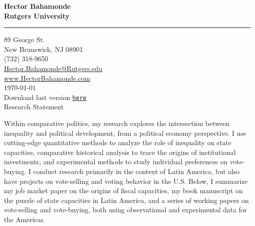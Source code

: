 \documentclass[11pt]{letter} %
\date{}
\begin{document}

\begin{letter}{} 


\begin{center}
\large\bf Hector Bahamonde \\ %
Rutgers University\\
\vspace{20pt} \hrule height 1pt %
89 George St. \\ New Brunswick, NJ 08901 \\ (732) 318-9650 \\ 
{\normalfont\normalsize\href{mailto:hector.bahamonde@rutgers.edu}{Hector.Bahamonde@Rutgers.edu}} \\
{\normalfont\normalsize\href{http://www.hectorbahamonde.com}{www.HectorBahamonde.com}}\\
{\normalfont \scriptsize{
\vspace{5mm}\today\\
Download last version \href{http://github.com/hbahamonde/Job_Market/raw/master/Bahamonde_Research_Statement.pdf}{\texttt{here}}}} %
\\
{\huge\vspace{8mm} Research Statement}
\end{center} 


\opening{} 
 
Within comparative politics, my research explores the intersection between inequality and political development, from a political economy perspective. I use cutting-edge quantitative methods to analyze the role of inequality on state capacities, comparative historical analysis to trace the origins of institutional investments, and experimental methods to study individual preferences on vote-buying. I conduct research primarily in the context of Latin America, but also have projects on vote-selling and voting behavior in the U.S. Below, I summarize my job market paper on the origins of fiscal capacities, my book manuscript on the puzzle of state capacities in Latin America, and a series of working papers on vote-selling and vote-buying, both using observational and experimental data for the Americas.


\end{letter}
\end{document}
